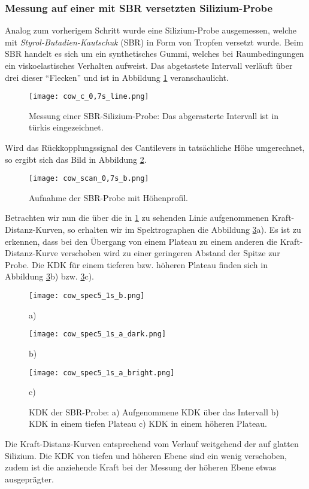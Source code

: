 \subsubsection{Messung auf einer mit SBR versetzten Silizium-Probe}
Analog zum vorherigem Schritt wurde eine Silizium-Probe ausgemessen, welche mit \emph{Styrol-Butadien-Kautschuk} (SBR) in Form von Tropfen versetzt wurde. Beim SBR handelt es sich um ein synthetisches Gummi, welches bei Raumbedingungen ein viskoelastisches Verhalten aufweist.
Das abgetastete Intervall verläuft über drei dieser ``Flecken'' und ist in Abbildung \ref{fig:cow_line} veranschaulicht.
\begin{figure}[h]
	\centering
	\texttt{[image: cow\_c\_0,7s\_line.png]}
	\caption[Messung einer SBR-Silizium-Probe]{Messung einer SBR-Silizium-Probe: Das abgerasterte Intervall ist in türkis eingezeichnet.}
	\label{fig:cow_line}
\end{figure}
Wird das Rückkopplungssignal des Cantilevers in tatsächliche Höhe umgerechnet, so ergibt sich das Bild in Abbildung \ref{fig:cow_z}.
\begin{figure}[h]
	\centering
	\texttt{[image: cow\_scan\_0,7s\_b.png]}
	\caption{Aufnahme der SBR-Probe mit Höhenprofil.}
	\label{fig:cow_z}
\end{figure}
Betrachten wir nun die über die in \ref{fig:cow_line} zu sehenden Linie aufgenommenen Kraft-Distanz-Kurven, so erhalten wir im Spektrographen die Abbildung \ref{fig:cow_spec}a). Es ist zu erkennen, dass bei den Übergang von einem Plateau zu einem anderen die Kraft-Distanz-Kurve verschoben wird zu einer geringeren Abstand der Spitze zur Probe. Die KDK für einem tieferen bzw. höheren Plateau finden sich in Abbildung \ref{fig:cow_spec}b) bzw. \ref{fig:cow_spec}c).
\begin{figure}[H]
\centering
	\begin{minipage}{0.3\textwidth}
	\centering
		\texttt{[image: cow\_spec5\_1s\_b.png]}
		\caption*{a)}	
	\end{minipage}
	\hfill
		\begin{minipage}{0.3\textwidth}
		\centering
		\texttt{[image: cow\_spec5\_1s\_a\_dark.png]}
		\caption*{b)}	
	\end{minipage}
	\hfill
	\begin{minipage}{0.3\textwidth}
	\centering
		\texttt{[image: cow\_spec5\_1s\_a\_bright.png]}
		\caption*{c)}	
	\end{minipage}
	\caption[Kraft-Distanz-Kurve der SBR-Probe]{KDK der SBR-Probe: a) Aufgenommene KDK über das Intervall b) KDK in einem tiefen Plateau c) KDK in einem höheren Plateau.}
	\label{fig:cow_spec}
\end{figure}
Die Kraft-Distanz-Kurven entsprechend vom Verlauf weitgehend der auf glatten Silizium. Die KDK von tiefen und höheren Ebene sind ein wenig verschoben, zudem ist die anziehende Kraft bei der Messung der höheren Ebene etwas ausgeprägter.
